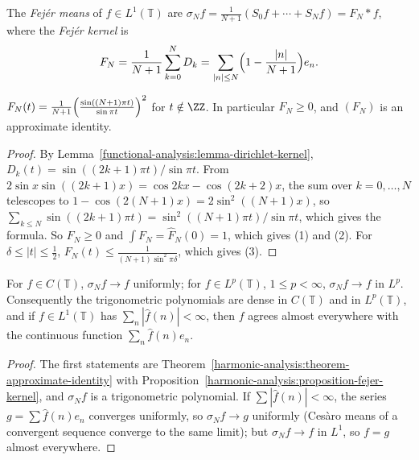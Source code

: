 \begin{definition}\label{harmonic-analysis:definition-fejer}
The \emph{Fej\'er means} of $f \in L^1(\mathbb{T})$ are $\sigma_Nf = \frac{1}{N + 1}(S_0f + \cdots + S_Nf) = F_N * f$, where the \emph{Fej\'er kernel} is
\[
F_N = \frac{1}{N + 1}\sum_{k=0}^ND_k = \sum_{|n| \leq N}\Bigl(1 - \frac{|n|}{N + 1}\Bigr)e_n.
\]
\end{definition}

\begin{proposition}\label{harmonic-analysis:proposition-fejer-kernel}
$F_N(t) = \frac{1}{N + 1}\Bigl(\frac{\sin((N + 1)\pi t)}{\sin\pi t}\Bigr)^2$ for $t \notin \ZZ$. In particular $F_N \geq 0$, and $(F_N)$ is an approximate identity.
\end{proposition}

\begin{proof}
By Lemma~\ref{functional-analysis:lemma-dirichlet-kernel}, $D_k(t) = \sin((2k + 1)\pi t)/\sin\pi t$. From $2\sin x\sin((2k + 1)x) = \cos 2kx - \cos(2k + 2)x$, the sum over $k = 0, \ldots, N$ telescopes to
$1 - \cos(2(N + 1)x) = 2\sin^2((N + 1)x)$, so $\sum_{k \leq N}\sin((2k + 1)\pi t) = \sin^2((N + 1)\pi t)/\sin\pi t$, which gives the formula. So $F_N \geq 0$ and $\int F_N = \hat F_N(0) = 1$, which gives (1) and (2).
For $\delta \leq |t| \leq \frac12$, $F_N(t) \leq \frac{1}{(N + 1)\sin^2\pi\delta}$, which gives (3).
\end{proof}

\begin{theorem}[Fej\'er]\label{harmonic-analysis:theorem-fejer}
For $f \in C(\mathbb{T})$, $\sigma_Nf \to f$ uniformly; for $f \in L^p(\mathbb{T})$, $1 \leq p < \infty$, $\sigma_Nf \to f$ in $L^p$. Consequently the trigonometric polynomials are dense in $C(\mathbb{T})$ and in $L^p(\mathbb{T})$, and if
$f \in L^1(\mathbb{T})$ has $\sum_n|\hat f(n)| < \infty$, then $f$ agrees almost everywhere with the continuous function $\sum_n\hat f(n)e_n$.
\end{theorem}

\begin{proof}
The first statements are Theorem~\ref{harmonic-analysis:theorem-approximate-identity} with Proposition~\ref{harmonic-analysis:proposition-fejer-kernel}, and $\sigma_Nf$ is a trigonometric polynomial. If $\sum|\hat f(n)| < \infty$, the series
$g = \sum\hat f(n)e_n$ converges uniformly, so $\sigma_Nf \to g$ uniformly (Ces\`aro means of a convergent sequence converge to the same limit); but $\sigma_Nf \to f$ in $L^1$, so $f = g$ almost everywhere.
\end{proof}

